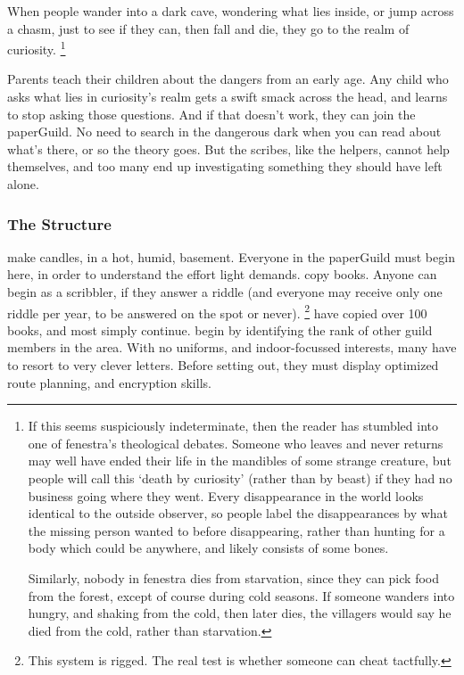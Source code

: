 \begin{multicols}{2}
When people wander into a dark cave, wondering what lies inside, or jump across a chasm, just to see if they can, then fall and die, they go to the realm of curiosity.%
\footnote{If this seems suspiciously indeterminate, then the reader has stumbled into one of \gls{fenestra}'s theological debates.
Someone who leaves and never returns may well have ended their life in the mandibles of some strange creature, but people will call this `death by curiosity' (rather than by beast) if they had no business going where they went.
Every disappearance in the world looks identical to the outside observer, so people label the disappearances by what the missing person wanted to before disappearing, rather than hunting for a body which could be anywhere, and likely consists of some bones.

Similarly, nobody in \gls{fenestra} dies from starvation, since they can pick food from the forest, except of course during cold seasons.
If someone wanders into  hungry, and shaking from the cold, then later dies, the villagers would say he died from the cold, rather than starvation.}

Parents teach their children about the dangers from an early age.
Any child who asks what lies in curiosity's realm gets a swift smack across the head, and learns to stop asking those questions.
And if that doesn't work, they can join the \gls{paperGuild}.
No need to search in the dangerous dark when you can read about what's there, or so the theory goes.
But the scribes, like the helpers, cannot help themselves, and too many end up investigating something they should have left alone.

\subsubsection{The Structure}

\begin{description}
  make candles, in a hot, humid, basement.
  Everyone in the \gls{paperGuild} must begin here, in order to understand the effort light demands.
  copy books.
  Anyone can begin as a scribbler, if they answer a riddle (and everyone may receive only one riddle per year, to be answered on the spot or never).%
  \footnote{This system is rigged. The real test is whether someone can cheat tactfully.}
  have copied over 100 books, and most simply continue.
  \label{knowledgeWanderer}%
  begin by identifying the rank of other guild members in the area.
  With no uniforms, and indoor-focussed interests, many have to resort to very clever letters.
  Before setting out, they must display optimized route planning, and encryption skills.


\end{description}
\end{multicols}
